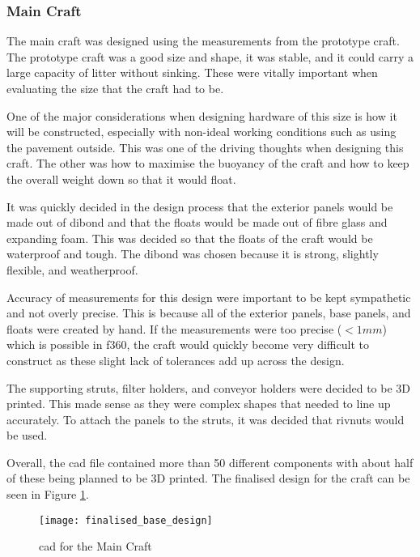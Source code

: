 \documentclass [12pt]{article}
\begin{document}
\subsubsection{Main Craft}\label{sec:main_craft_cad}

The main craft was designed using the measurements from the prototype craft. The prototype craft was a good size and shape, it was stable, and it could carry a large capacity of litter without sinking. These were vitally important when evaluating the size that the craft had to be. 

One of the major considerations when designing hardware of this size is how it will be constructed, especially with non-ideal working conditions such as using the pavement outside.  This was one of the driving thoughts when designing this craft. The other was how to maximise the buoyancy of the craft and how to keep the overall weight down so that it would float. 

It was quickly decided in the design process that the exterior panels would be made out of \gls{dibond} and that the floats would be made out of fibre glass and expanding foam. This was decided so that the floats of the craft would be waterproof and tough. The \gls{dibond} was chosen because it is strong, slightly flexible, and weatherproof. 

Accuracy of measurements for this design were important to be kept sympathetic and not overly precise. This is because all of the exterior panels, base panels, and floats were created by hand. If the measurements were too precise ($<1mm$) which is possible in \gls{f360}, the craft would quickly become very difficult to construct as these slight lack of tolerances add up across the design.

The supporting struts, filter holders, and conveyor holders were decided to be 3D printed. This made sense as they were complex shapes that needed to line up accurately. To attach the panels to the struts, it was decided that \gls{rivnut}s would be used. 

Overall, the \gls{cad} file contained more than 50 different components with about half of these being planned to be 3D printed. The finalised design for the craft can be seen in Figure \ref{fig:finalised_base_design}. 

\begin{figure}[H]
\centerline{\texttt{[image: finalised\_base\_design]}}
\caption{\gls{cad} for the Main Craft}
\label{fig:finalised_base_design}
\end{figure}
\end{document}
